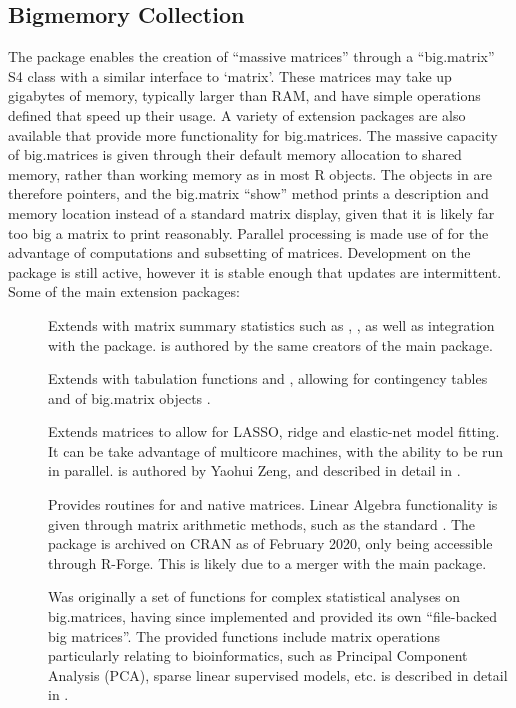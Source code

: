 \subsection{Bigmemory Collection}\label{subsec:bigmemory-collection}

The  package enables the creation of ``massive matrices'' through a ``big.matrix'' S4 class with a similar interface to `matrix'\cite{kane13:bigmemory}.
These matrices may take up gigabytes of memory, typically larger than RAM, and have simple operations defined that speed up their usage.
A variety of extension packages are also available that provide more functionality for big.matrices.
The massive capacity of big.matrices is given through their default memory allocation to shared memory, rather than working memory as in most R objects.
The objects in \R{} are therefore pointers, and the big.matrix ``show'' method prints a description and memory location instead of a standard matrix display, given that it is likely far too big a matrix to print reasonably.
Parallel processing is made use of for the advantage of computations and subsetting of matrices.
Development on the package is still active, however it is stable enough that updates are intermittent.
Some of the main extension packages:

\begin{description} \item[] Extends  with matrix summary statistics such as , , as well as integration with the  package\cite{emerson16}.
		 is authored by the same creators
		of the main  package.
	\item[]
		Extends  with tabulation functions and ,
		allowing for contingency tables and  of big.matrix
		objects \cite{kane16}.
	\item[]
		Extends  matrices to allow for LASSO, ridge and elastic-net
		model fitting.
		It can be take advantage of multicore machines, with the ability to be run in parallel.
		 is authored by Yaohui Zeng, and
		described in detail in \textcite{zeng2017biglasso}.
	\item[]
		Provides  routines for  and native \R{} matrices.
		Linear Algebra functionality is given through matrix arithmetic methods, such as the standard .
		The package is archived on CRAN as of February 2020, only being accessible through R-Forge.
		This is likely due to a merger with the main  package.
	\item[]
		Was originally a set of functions for complex statistical analyses on
		big.matrices, having since implemented and provided its own
		``file-backed big matrices''\cite{prive2018efficient}.
		The provided functions include matrix operations particularly relating to bioinformatics, such as Principal Component Analysis (PCA), sparse linear supervised models, etc.  is described in detail in \textcite{prive2018efficient}.
\end{description}

